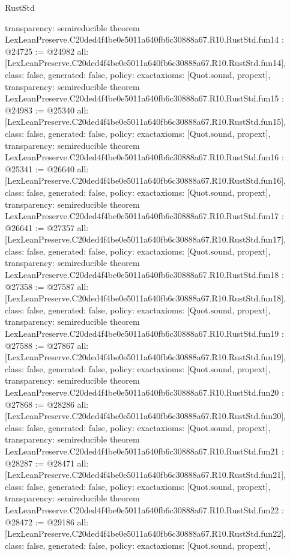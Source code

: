 \begin{lexlean}{RustStd}
\begin{coremodule}
{  transparency: semireducible
}
theorem LexLeanPreserve.C20ded4f4be0e5011a640fb6c30888a67.R10.RustStd.fun14 : @24725 := @24982 {
  all: [LexLeanPreserve.C20ded4f4be0e5011a640fb6c30888a67.R10.RustStd.fun14],
  class: false,
  generated: false,
  policy: exact{axioms: [Quot.sound, propext]},
  transparency: semireducible
}
theorem LexLeanPreserve.C20ded4f4be0e5011a640fb6c30888a67.R10.RustStd.fun15 : @24983 := @25340 {
  all: [LexLeanPreserve.C20ded4f4be0e5011a640fb6c30888a67.R10.RustStd.fun15],
  class: false,
  generated: false,
  policy: exact{axioms: [Quot.sound, propext]},
  transparency: semireducible
}
theorem LexLeanPreserve.C20ded4f4be0e5011a640fb6c30888a67.R10.RustStd.fun16 : @25341 := @26640 {
  all: [LexLeanPreserve.C20ded4f4be0e5011a640fb6c30888a67.R10.RustStd.fun16],
  class: false,
  generated: false,
  policy: exact{axioms: [Quot.sound, propext]},
  transparency: semireducible
}
theorem LexLeanPreserve.C20ded4f4be0e5011a640fb6c30888a67.R10.RustStd.fun17 : @26641 := @27357 {
  all: [LexLeanPreserve.C20ded4f4be0e5011a640fb6c30888a67.R10.RustStd.fun17],
  class: false,
  generated: false,
  policy: exact{axioms: [Quot.sound, propext]},
  transparency: semireducible
}
theorem LexLeanPreserve.C20ded4f4be0e5011a640fb6c30888a67.R10.RustStd.fun18 : @27358 := @27587 {
  all: [LexLeanPreserve.C20ded4f4be0e5011a640fb6c30888a67.R10.RustStd.fun18],
  class: false,
  generated: false,
  policy: exact{axioms: [Quot.sound, propext]},
  transparency: semireducible
}
theorem LexLeanPreserve.C20ded4f4be0e5011a640fb6c30888a67.R10.RustStd.fun19 : @27588 := @27867 {
  all: [LexLeanPreserve.C20ded4f4be0e5011a640fb6c30888a67.R10.RustStd.fun19],
  class: false,
  generated: false,
  policy: exact{axioms: [Quot.sound, propext]},
  transparency: semireducible
}
theorem LexLeanPreserve.C20ded4f4be0e5011a640fb6c30888a67.R10.RustStd.fun20 : @27868 := @28286 {
  all: [LexLeanPreserve.C20ded4f4be0e5011a640fb6c30888a67.R10.RustStd.fun20],
  class: false,
  generated: false,
  policy: exact{axioms: [Quot.sound, propext]},
  transparency: semireducible
}
theorem LexLeanPreserve.C20ded4f4be0e5011a640fb6c30888a67.R10.RustStd.fun21 : @28287 := @28471 {
  all: [LexLeanPreserve.C20ded4f4be0e5011a640fb6c30888a67.R10.RustStd.fun21],
  class: false,
  generated: false,
  policy: exact{axioms: [Quot.sound, propext]},
  transparency: semireducible
}
theorem LexLeanPreserve.C20ded4f4be0e5011a640fb6c30888a67.R10.RustStd.fun22 : @28472 := @29186 {
  all: [LexLeanPreserve.C20ded4f4be0e5011a640fb6c30888a67.R10.RustStd.fun22],
  class: false,
  generated: false,
  policy: exact{axioms: [Quot.sound, propext]},
}
\end{coremodule}
\end{lexlean}
